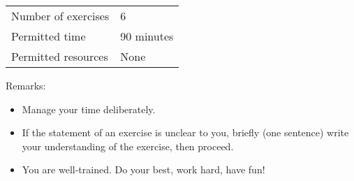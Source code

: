 \begin{center}
\begin{tabular}{l@{ : }l}
Number of exercises	&	6			\\
Permitted time		&	90 minutes	\\
Permitted resources	&	None
\end{tabular}
\end{center}
\vspace{.25in}
\noindent{}Remarks:
\begin{itemize}
\item Manage your time deliberately.
\item If the statement of an exercise is unclear to you, briefly (one sentence) write your understanding of the exercise, then proceed.
\item You are well-trained. Do your best, work hard, have fun!
\end{itemize}